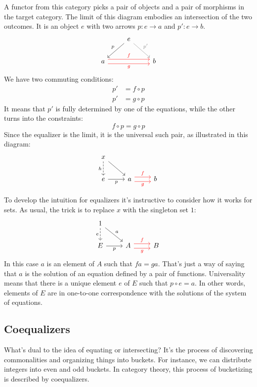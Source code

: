 \documentclass[DaoFP]{subfiles}
\begin{document}
A functor from this category picks a pair of objects and a pair of morphisms in the target category. The limit of this diagram embodies an intersection of the two outcomes. It is an object $e$ with two arrows $p \colon e \to a$ and $p' \colon e \to b$.
\[
\begin{tikzcd}
& e
\arrow[dl, "p"']
\arrow[dr, gray, "p'"]
\\
a 
\arrow[rr, red, shift left=.75ex, "f"]
\arrow[rr, red, shift right=.75ex, "g"']
&&
b
\end{tikzcd}
\]
We have two commuting conditions:
\begin{align*}
p' &= f \circ p \\
p' &= g \circ p
\end{align*}
It means that $p'$ is fully determined by one of the equations, while the other turns into the constraints:
\[ f \circ p = g \circ p \]
Since the equalizer is the limit, it is the universal such pair, as illustrated in this diagram:
\[
\begin{tikzcd}
x
\arrow[d, dashed, "h"']
\arrow[dr, ""]
\\
e
\arrow[r, "p"']
&
a \arrow[r, red, shift left=0.75ex, "f"]
  \arrow[r, red, shift right=0.75ex, "g"']
&
b
\end{tikzcd}
\]

To develop the intuition for equalizers it's instructive to consider how it works for sets. As usual, the trick is to replace $x$ with the singleton set $1$:
\[
\begin{tikzcd}
1
\arrow[d, dashed, "e"']
\arrow[dr, "a"]
\\
E
\arrow[r, "p"']
&
A \arrow[r, red, shift left=0.75ex, "f"]
  \arrow[r, red, shift right=0.75ex, "g"']
&
B
\end{tikzcd}
\]
In this case $a$ is an element of $A$ such that $f a = g a$. That's just a way of saying that $a$ is the solution of an equation defined by a pair of functions. Universality means that there is a unique element $e$ of $E$ such that $p \circ e = a$. In other words, elements of $E$ are in one-to-one correspondence with the solutions of the system of equations. 

\subsection{Coequalizers}

What's dual to the idea of equating or intersecting? It's the process of discovering commonalities and organizing things into buckets. For instance, we can distribute integers into even and odd buckets. In category theory, this process of bucketizing is described by coequalizers.
\end{document}
